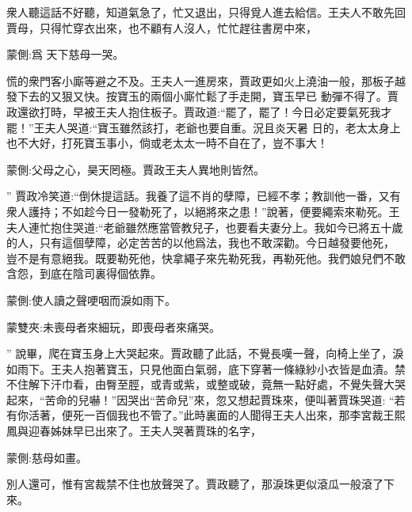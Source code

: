 \begin{parag}
    衆人聽這話不好聽，知道氣急了，忙又退出，只得覓人進去給信。王夫人不敢先回賈母，只得忙穿衣出來，也不顧有人沒人，忙忙趕往書房中來，\begin{note}蒙側:爲 天下慈母一哭。\end{note}慌的衆門客小廝等避之不及。王夫人一進房來，賈政更如火上澆油一般，那板子越發下去的又狠又快。按寶玉的兩個小廝忙鬆了手走開，寶玉早已 動彈不得了。賈政還欲打時，早被王夫人抱住板子。賈政道:“罷了，罷了！今日必定要氣死我才罷！”王夫人哭道:“寶玉雖然該打，老爺也要自重。況且炎天暑 日的，老太太身上也不大好，打死寶玉事小，倘或老太太一時不自在了，豈不事大！\begin{note}蒙側:父母之心，昊天罔極。賈政王夫人異地則皆然。\end{note}” 賈政冷笑道:“倒休提這話。我養了這不肖的孽障，已經不孝；教訓他一番，又有衆人護持；不如趁今日一發勒死了，以絕將來之患！”說著，便要繩索來勒死。王夫人連忙抱住哭道:“老爺雖然應當管教兒子，也要看夫妻分上。我如今已將五十歲的人，只有這個孽障，必定苦苦的以他爲法，我也不敢深勸。今日越發要他死， 豈不是有意絕我。既要勒死他，快拿繩子來先勒死我，再勒死他。我們娘兒們不敢含怨，到底在陰司裏得個依靠。\begin{note}蒙側:使人讀之聲哽咽而淚如雨下。\end{note}\begin{note}蒙雙夾:未喪母者來細玩，即喪母者來痛哭。\end{note}” 說畢，爬在寶玉身上大哭起來。賈政聽了此話，不覺長嘆一聲，向椅上坐了，淚如雨下。王夫人抱著寶玉，只見他面白氣弱，底下穿著一條綠紗小衣皆是血漬。禁不住解下汗巾看，由臀至脛，或青或紫，或整或破，竟無一點好處，不覺失聲大哭起來，“苦命的兒嚇！”因哭出“苦命兒”來，忽又想起賈珠來，便叫著賈珠哭道: “若有你活著，便死一百個我也不管了。”此時裏面的人聞得王夫人出來，那李宮裁王熙鳳與迎春姊妹早已出來了。王夫人哭著賈珠的名字，\begin{note}蒙側:慈母如畫。\end{note}別人還可，惟有宮裁禁不住也放聲哭了。賈政聽了，那淚珠更似滾瓜一般滾了下來。
\end{parag}


